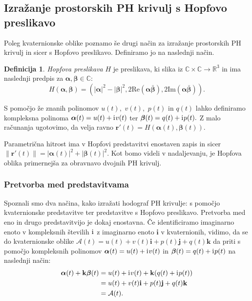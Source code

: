 \documentclass[12pt,a4paper,twoside]{article}
\newcommand{\iu}{\mathrm{i}\mkern1mu} %
\theoremstyle{definition} %
\newtheorem{definicija}{Definicija}[section]
\theoremstyle{plain} %
\numberwithin{equation}{section}  %
\newcommand{\R}{\mathbb R}
\renewcommand{\C}{\mathbb C}
\begin{document}
\subsection{Izražanje prostorskih PH krivulj s Hopfovo preslikavo}

Poleg kvaternionske oblike poznamo še drugi način za izražanje prostorskih PH krivulj in sicer s Hopfovo preslikavo. Definiramo jo na naslednji način.
\begin{definicija}
	\label{hopf_def}
	\emph{Hopfova preslikava} $H$ je preslikava, ki slika iz $\C \times \C \to \R^3$ in ima naslednji predpis za $\boldsymbol\alpha, \boldsymbol\beta \in \C:$
	\begin{equation}
		\label{hoph}
		H(\boldsymbol\alpha, \boldsymbol\beta)=(|\boldsymbol\alpha|^2-|\boldsymbol\beta|^2,2\mathrm{Re}(\boldsymbol\alpha \bar{\boldsymbol\beta}),2\mathrm{Im}(\boldsymbol\alpha \bar{\boldsymbol\beta})).
	\end{equation}
\end{definicija}
S pomočjo že znanih polinomov $u(t),$ $v(t),$ $p(t)$ in $q(t)$ lahko definiramo kompleksna polinoma $\boldsymbol\alpha(t)=u(t)+\iu v(t)$ ter $\boldsymbol\beta(t)=q(t)+\iu p(t).$ Z malo računanja ugotovimo, da velja ravno $\mathbf{r'}(t)=H(\boldsymbol\alpha(t),\boldsymbol\beta(t)).$

Parametrična hitrost ima v Hopfovi predstavitvi enostaven zapis in sicer \\ $\lVert \mathbf{r'}(t) \rVert=|\boldsymbol\alpha(t)|^2+|\boldsymbol\beta(t)|^2.$ Kot bomo videli v nadaljevanju, je Hopfova oblika primernejša za obravnavo dvojnih PH krivulj.

\subsubsection{Pretvorba med predstavitvama}

Spoznali smo dva načina, kako izražati hodograf PH krivulje: s pomočjo kvaternionske predstavitve ter predstavitve s Hopfovo preslikavo. Pretvorba med eno in drugo predstavitvijo je dokaj enostavna. Če identificiramo imaginarno enoto v kompleksnih številih $\iu$ z imaginarno enoto $\mathbf{i}$ v kvaternionih, vidimo, da se do kvaternionske oblike $\mathcal{A}(t)=u(t)+v(t)\mathbf{i}+p(t)\mathbf{j}+q(t)\mathbf{k}$ da priti s pomočjo kompleksnih polinomov $\boldsymbol\alpha(t)=u(t)+\iu v(t)$ in $\boldsymbol\beta(t)=q(t)+\iu p(t)$ na naslednji način:
\begin{align}
	\label{comp_to_quat}
	\boldsymbol\alpha(t)+\mathbf{k}\boldsymbol\beta(t) &= u(t)+\iu v(t)+\mathbf{k}(q(t)+ \iu p(t)) \nonumber \\
	&=u(t)+v(t)\mathbf{i} + p(t)\mathbf{j}+ q(t)\mathbf{k} \nonumber \\
	&= \mathcal{A}(t).
\end{align}
\end{document}
